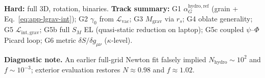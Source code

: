 \documentclass[11pt,a4paper]{article}
\begin{document}
\textbf{Hard:} full 3D, rotation, binaries.
\textbf{Track summary:} G1 $\alpha_G^{\mathrm{hydro,ref}}$ (grain + Eq.~\ref{eq:app-lgrav-int}); G2 $\gamma_0$ from $\mathcal{L}_{\mathrm{vac}}$; G3 $M_{\mathrm{grav}}$ via $r_s$; G4 oblate generality; G5 $\mathcal{L}_{\mathrm{int,grav}}$; G5b full $S_M$ EL (quasi-static reduction on laptop); G5c coupled $\psi$--$\Phi$ Picard loop; G6 metric $\delta S/\delta g_{\mu\nu}$ ($\kappa$-level).

\textbf{Diagnostic note.}
An earlier full-grid Newton fit falsely implied $N_{\mathrm{hydro}} \sim 10^2$ and $f \sim 10^{-3}$; exterior evaluation restores $N \approx 0.98$ and $f \approx 1.02$.


\printbibliography
\end{document}

